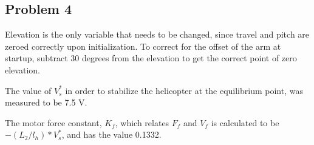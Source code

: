 \subsection{Problem 4}
Elevation is the only variable that needs to be changed, since travel
and pitch are zeroed correctly upon initialization. To correct for the
offset of the arm at startup, subtract 30 degrees from the elevation
to get the correct point of zero elevation.

The value of $V^*_s$ in order to stabilize the helicopter at the equilibrium point, was measured to be 7.5 V.  

The motor force constant, $K_f$, which relates $F_f$ and $V_f$ is
calculated to be $-(L_2/l_h)*V^*_s$, and has the value 0.1332.


